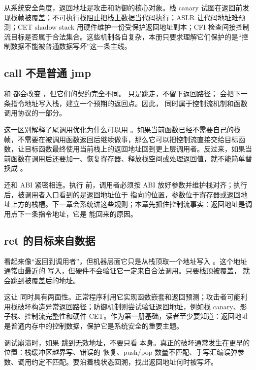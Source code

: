 从系统安全角度，返回地址是攻击和防御的核心对象。栈 canary 试图在返回前发现栈帧被覆盖；不可执行栈阻止把栈上数据当代码执行；ASLR 让代码地址难预测；CET shadow stack 用硬件维护一份受保护返回地址副本；CFI 检查间接控制流目标是否属于合法集合。这些机制各自复杂，本册只要求理解它们保护的是“控制数据不能被普通数据写坏”这一条主线。

\subsection{call 不是普通 jmp}

 和  都会改变 ，但它们的契约完全不同。 只是跳走，不留下返回路径； 会把下一条指令地址写入栈，建立一个预期的返回点。因此， 同时属于控制流机制和函数调用协议的一部分。

这一区别解释了尾调用优化为什么可以用 。如果当前函数已经不需要自己的栈帧，不需要在被调用函数返回后继续做事，那么它可以把控制流直接交给目标函数，让目标函数最终使用当前栈上的返回地址回到更上层调用者。反过来，如果当前函数在调用后还要加一、恢复寄存器、释放栈空间或处理返回值，就不能简单替换成 。

 还和 ABI 紧密相连。执行  前，调用者必须按 ABI 放好参数并维护栈对齐；执行  后，被调用者入口看到的是返回地址位于  指向的位置，参数位于寄存器或返回地址上方的栈槽。下一章会系统讲这些规则；本章先抓住控制流事实：返回地址是调用点下一条指令地址，它是  能回来的原因。

\subsection{ret 的目标来自数据}

 看起来像“返回到调用者”，但机器层面它只是从栈顶取一个地址写入 。这个地址通常由最近的  写入，但硬件不会验证它一定来自合法调用。只要栈顶被覆盖， 就会跳到被覆盖后的地址。

这让  同时具有两面性。正常程序利用它实现函数嵌套和返回预测；攻击者可能利用栈破坏构造异常返回路径；防御机制则尝试验证返回地址，例如栈 canary、影子栈、控制流完整性和硬件 CET。作为第一册基础，读者至少要知道：返回地址是普通内存中的控制数据，保护它是系统安全的重要主题。

调试崩溃时，如果  跳到无效地址，不要只看  本身。真正的破坏通常发生在更早的位置：栈缓冲区越界写、错误的  恢复、push/pop 数量不匹配、手写汇编误弹参数、调用约定不匹配。要沿着栈状态回溯，找出返回地址何时被写坏。

